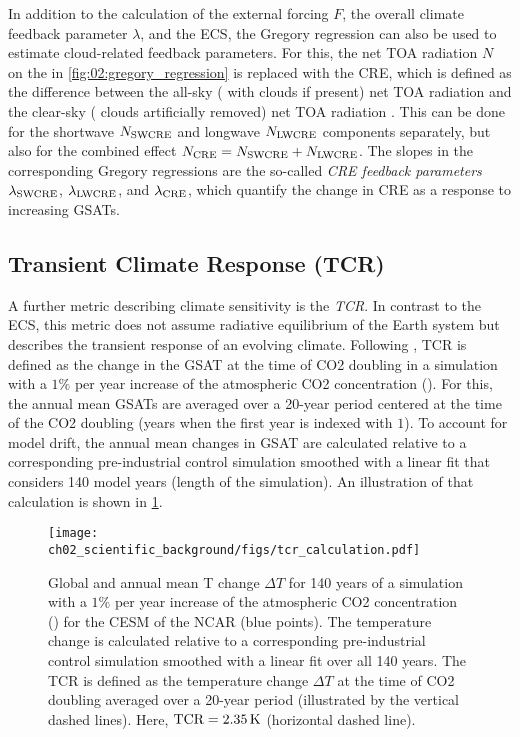 In addition to the calculation of the external forcing $F$, the overall climate
feedback parameter $\lambda$, and the \ac{ECS}, the Gregory regression can also
be used to estimate cloud-related feedback parameters. For this, the net
\ac{TOA} radiation $N$ on the \yaxis{} in \cref{fig:02:gregory_regression} is
replaced with the \ac{CRE}, which is defined as the difference between the
all-sky (\ie{} with clouds if present) net \ac{TOA} radiation and the clear-sky
(\ie{} clouds artificially removed) net \ac{TOA} radiation
\autocite{Andrews2012}. This can be done for the shortwave $N_\mathtxt{SWCRE}$
and longwave $N_\mathtxt{LWCRE}$ components separately, but also for the
combined effect $N_\mathtxt{CRE} = N_\mathtxt{SWCRE} + N_\mathtxt{LWCRE}$. The
slopes in the corresponding Gregory regressions are the so-called
\emph{\ac{CRE} feedback parameters} $\lambda_\mathtxt{SWCRE}$,
$\lambda_\mathtxt{LWCRE}$, and $\lambda_\mathtxt{CRE}$, which quantify the
change in \ac{CRE} as a response to increasing \acp{GSAT}.


\subsection{Transient Climate Response (\acs{TCR})}
\label{subsec:02:tcr}

A further metric describing climate sensitivity is the \emph{\ac{TCR}}. In
contrast to the \ac{ECS}, this metric does not assume radiative equilibrium of
the Earth system but describes the transient response of an evolving climate.
Following \textcite{Bindoff2013}, \ac{TCR} is defined as the change in the
\ac{GSAT} at the time of \ac{CO2} doubling in a simulation with a $1 \unit{\%}$
per year increase of the atmospheric \ac{CO2} concentration (\onepctcotwo{}).
For this, the annual mean \acp{GSAT} are averaged over a 20-year period
centered at the time of the \ac{CO2} doubling (years  when the
first year is indexed with $1$). To account for model drift, the annual mean
changes in \ac{GSAT} are calculated relative to a corresponding pre-industrial
control simulation smoothed with a linear fit that considers 140 model years
(length of the \onepctcotwo{} simulation). An illustration of that calculation
is shown in \cref{fig:02:tcr}.

\begin{figure}[t]
  \centering
  \texttt{[image: 
    ch02\_scientific\_background/figs/tcr\_calculation.pdf]}
  \caption[
    Illustration of the definition of the \acf{TCR}.
  ]{
    Global and annual mean \acl{T} change $\Delta T$ for 140 years of a
    simulation with a $1 \unit{\%}$ per year increase of the atmospheric
    \acs{CO2} concentration (\onepctcotwo{}) for the \acf{CESM} of the
    \acf{NCAR} (blue points). The temperature change is calculated relative to
    a corresponding pre-industrial control simulation smoothed with a linear
    fit over all 140 years. The \acf{TCR} is defined as the temperature change
    $\Delta T$ at the time of \acs{CO2} doubling averaged over a 20-year period
    (illustrated by the vertical dashed lines). Here, $\mathtxt{TCR} = 2.35
    \unit{K}$ (horizontal dashed line).
  }
  \label{fig:02:tcr}
\end{figure}

